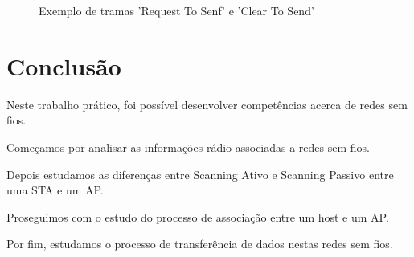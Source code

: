 \documentclass[11pt]{article}
\begin{document}
\begin{figure}[hbt!]
    \centering
    \caption{Exemplo de tramas 'Request To Senf' e 'Clear To Send'}
\end{figure}


\clearpage
\section{Conclusão}

Neste trabalho prático, foi possível desenvolver competências acerca de redes sem fios.

Começamos por analisar as informações rádio associadas a redes sem fios.

Depois estudamos as diferenças entre Scanning Ativo e Scanning Passivo entre uma STA e um AP.

Proseguimos com o estudo do processo de associação entre um host e um AP.

Por fim, estudamos o processo de transferência de dados nestas redes sem fios.
\end{document}
